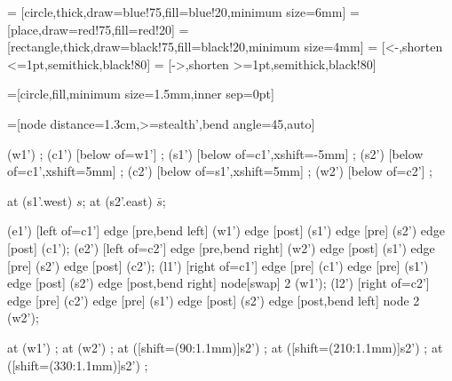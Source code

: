 {
  
=     [circle,thick,draw=blue!75,fill=blue!20,minimum size=6mm]
= [place,draw=red!75,fill=red!20]
=[rectangle,thick,draw=black!75,fill=black!20,minimum size=4mm]
=       [<-,shorten <=1pt,semithick,black!80]
=      [->,shorten >=1pt,semithick,black!80]

=[circle,fill,minimum size=1.5mm,inner sep=0pt]

=[node distance=1.3cm,>=stealth',bend angle=45,auto]
\begin{codeexample}[pre=\begin{tikzpicture},post=\end{tikzpicture}]
  \begin{scope}[xshift=6cm]    
    \node [place]     (w1')                            {};
    \node [place]     (c1') [below of=w1']             {};
     (s1') [below of=c1',xshift=-5mm] {};
     (s2') [below of=c1',xshift=5mm]  {};
    \node [place]     (c2') [below of=s1',xshift=5mm]  {};
    \node [place]     (w2') [below of=c2']             {};
    
      at (s1'.west) {$s$};
     at (s2'.east) {$\bar s$};
    
    \node [transition] (e1') [left of=c1'] {}
      edge [pre,bend left]                  (w1')
      edge [post]                           (s1')
      edge [pre]                            (s2')
      edge [post]                           (c1');
    \node [transition] (e2') [left of=c2'] {}
      edge [pre,bend right]                 (w2')
      edge [post]                           (s1')
      edge [pre]                            (s2')
      edge [post]                           (c2');
    \node [transition] (l1') [right of=c1'] {}
      edge [pre]                            (c1')
      edge [pre]                            (s1')
      edge [post]                           (s2')
      edge [post,bend right] node[swap] {2} (w1');
    \node [transition] (l2') [right of=c2'] {}
      edge [pre]                            (c2')
      edge [pre]                            (s1')
      edge [post]                           (s2')
      edge [post,bend left]  node {2}       (w2');

    \node [mark] at (w1') {};
    \node [mark] at (w2') {};
    \node [mark] at ([shift={(90:1.1mm)}]s2') {};
    \node [mark] at ([shift={(210:1.1mm)}]s2') {};
    \node [mark] at ([shift={(330:1.1mm)}]s2') {};
  \end{scope}
\end{codeexample}
}


